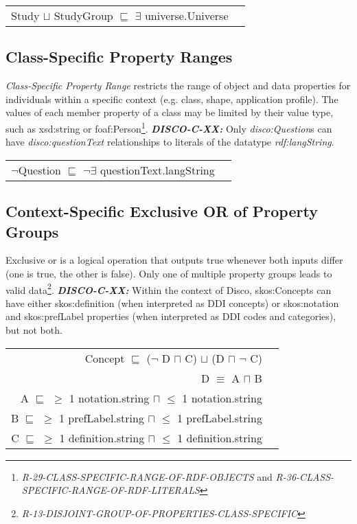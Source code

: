 \documentclass{llncs}
\newenvironment{DL}{
  \vspace{0cm}
  \begin{tabular}{r l}

}{
  \end{tabular}
}
\begin{document}
\begin{DL}
Study $\sqcup$ StudyGroup $\sqsubseteq$ $\exists$ universe.Universe \\
\end{DL}

\subsection{Class-Specific Property Ranges}		

{\em Class-Specific Property Range} restricts the range of object and data properties for individuals within a specific context (e.g. class, shape, application profile).
The values of each member property of a class may be limited by their value type, such as xsd:string or foaf:Person\footnote{{\em R-29-CLASS-SPECIFIC-RANGE-OF-RDF-OBJECTS} and {\em R-36-CLASS-SPECIFIC-RANGE-OF-RDF-LITERALS}}. 
\textbf{{\em DISCO-C-XX:}} 
Only {\em disco:Question}s can have {\em disco:questionText} relationships to literals of the datatype {\em rdf:langString}.

\begin{DL}
$\neg$Question $\sqsubseteq$ $\neg\exists$ questionText.langString
\end{DL}

\subsection{Context-Specific Exclusive OR of Property Groups}

Exclusive or is a logical operation that outputs true whenever both inputs differ (one is true, the other is false).
Only one of multiple property groups leads to valid data\footnote{{\em R-13-DISJOINT-GROUP-OF-PROPERTIES-CLASS-SPECIFIC}}.
\textbf{{\em DISCO-C-XX:}}
Within the context of Disco, skos:Concepts can have either skos:definition (when interpreted as DDI concepts) or skos:notation and skos:prefLabel properties (when interpreted as DDI codes and categories), but not both.

\begin{DL}
Concept $\sqsubseteq$ ($\neg$ D $\sqcap$ C) $\sqcup$ (D $\sqcap$ $\neg$ C) \\ 
D $\equiv$ A $\sqcap$ B \\
A $\sqsubseteq$ $\geq$ 1 notation.string $\sqcap$ $\leq$ 1 notation.string \\
B $\sqsubseteq$ $\geq$ 1 prefLabel.string $\sqcap$ $\leq$ 1 prefLabel.string \\
C $\sqsubseteq$ $\geq$ 1 definition.string $\sqcap$ $\leq$ 1 definition.string \\
\end{DL}
\end{document}
